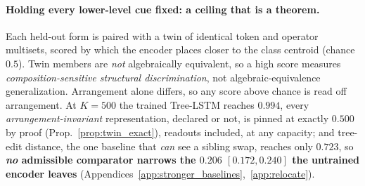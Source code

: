 \paragraph{Holding every lower-level cue fixed: a ceiling that is a theorem.} Each held-out form is paired with a twin of identical token and operator multisets, scored by which the encoder places closer to the class centroid (chance $0.5$). Twin members are \emph{not} algebraically equivalent, so a high score measures \emph{composition-sensitive structural discrimination}, not algebraic-equivalence generalization. Arrangement alone differs, so any score above chance is read off arrangement. At $K{=}500$ the trained Tree-LSTM reaches $\mathbf{0.994}$, every \emph{arrangement-invariant} representation, declared or not, is pinned at exactly $0.500$ by proof (Prop.~\ref{prop:twin_exact}), readouts included, at any capacity; and tree-edit distance, the one baseline that \emph{can} see a sibling swap, reaches only $0.723$, so \textbf{\emph{no} admissible comparator narrows the $0.206$ $[0.172,0.240]$ the untrained encoder leaves} (Appendices~\ref{app:stronger_baselines},~\ref{app:relocate}).

